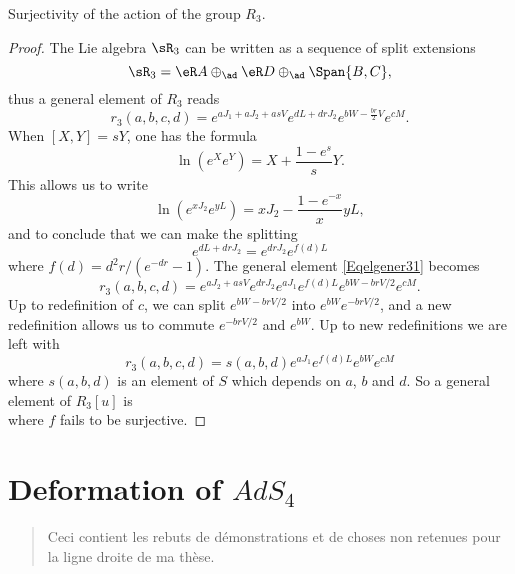 \begin{proposition}
Surjectivity of the action of the group $R_3$.
\end{proposition}

\begin{proof}
The Lie algebra $\sR_3$ can be written as a sequence of split extensions
\[ 
  \sR_3=\eR A\oplus_{\ad}\eR D\oplus_{\ad}\Span\{ B,C \},
\]
thus a general element of $R_3$ reads
\begin{equation}  \label{Eqelgener31}
r_3(a,b,c,d)= e^{aJ_1+aJ_2+asV} e^{dL+drJ_2} e^{bW-\frac{ br }{2}V} e^{cM}.
\end {equation}
When $[X,Y]=sY$, one has the formula
\begin{equation}
 \ln(e^{X} e^{Y})=X+\frac{ 1- e^{s} }{ s }Y.
\end{equation}
This allows us to write
\[ 
  \ln( e^{xJ_2} e^{yL})= xJ_2-\frac{ 1- e^{-x} }{ x }yL,
\]
and to conclude that we can make the splitting
\[ 
   e^{dL+drJ_2}= e^{drJ_2} e^{f(d)L}
\]
where $f(d)=d^{2}r/( e^{-dr}-1)$. The general element \eqref{Eqelgener31} becomes
\[ 
  r_3(a,b,c,d)= e^{aJ_2+asV} e^{drJ_2} e^{aJ_1} e^{f(d)L} e^{bW-brV/2} e^{cM}.
\]
Up to redefinition of $c$, we can split $ e^{bW-brV/2}$ into $ e^{bW} e^{-brV/2}$, and a new redefinition allows us to commute $ e^{-brV/2}$ and $ e^{bW}$. Up to new redefinitions we are left with
\[ 
  r_3(a,b,c,d)=s(a,b,d) e^{aJ_1} e^{f(d)L} e^{bW} e^{cM}
\]
where $s(a,b,d)$ is an element of $S$ which depends on $a$, $b$ and $d$. So a general element of $R_3[u]$ is
\begin{equation}
  [ e^{cM} e^{bW} e^{-f(d)L} e^{aJ_1}u]
\end{equation}
where $f$ fails to be surjective.
\end{proof}

%
   \section{Deformation of \texorpdfstring{$AdS_4$}{AdS4}}
%


\begin{abstract}
Ceci contient les rebuts de démonstrations et de choses non retenues pour la ligne droite de ma thèse.
\end{abstract}

